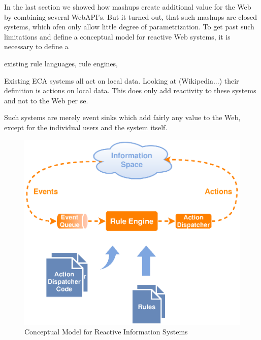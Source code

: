 
In the last section we showed how mashups create additional value for the Web by combining several WebAPI's.
But it turned out, that such mashups are closed systems, which ofen only allow little degree of parametrization.
To get past such limitations and define a conceptual model for reactive Web systems, it is necessary to define a 

existing rule languages, rule engines, 

Existing ECA systems all act on local data.
Looking at (Wikipedia...) their definition is actions on local data.
This does only add reactivity to these systems and not to the Web per se.

Such systems are merely event sinks which add fairly any value to the Web, except for the individual users and the system itself.

\begin{figure}[!ht]
  \centering
  \includegraphics{figures/Standard-Model-Template}
  \caption{Conceptual Model for Reactive Information Systems}
  \label{fig:Standard-Model-Template}
\end{figure}



